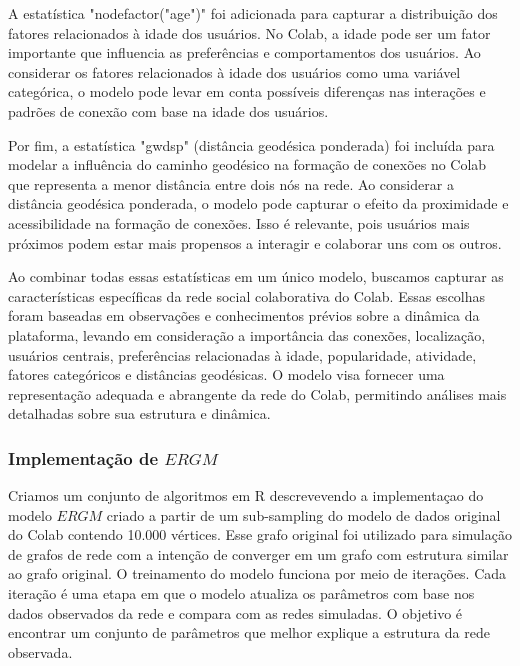 A estatística "nodefactor("age")" foi adicionada para capturar a distribuição dos fatores relacionados à idade dos usuários. No Colab, a idade pode ser um fator importante que influencia as preferências e comportamentos dos usuários. Ao considerar os fatores relacionados à idade dos usuários como uma variável categórica, o modelo pode levar em conta possíveis diferenças nas interações e padrões de conexão com base na idade dos usuários.

Por fim, a estatística "gwdsp" (distância geodésica ponderada) foi incluída para modelar a influência do caminho geodésico na formação de conexões no Colab que representa a menor distância entre dois nós na rede. Ao considerar a distância geodésica ponderada, o modelo pode capturar o efeito da proximidade e acessibilidade na formação de conexões. Isso é relevante, pois usuários mais próximos podem estar mais propensos a interagir e colaborar uns com os outros.

Ao combinar todas essas estatísticas em um único modelo, buscamos capturar as características específicas da rede social colaborativa do Colab. Essas escolhas foram baseadas em observações e conhecimentos prévios sobre a dinâmica da plataforma, levando em consideração a importância das conexões, localização, usuários centrais, preferências relacionadas à idade, popularidade, atividade, fatores categóricos e distâncias geodésicas. O modelo visa fornecer uma representação adequada e abrangente da rede do Colab, permitindo análises mais detalhadas sobre sua estrutura e dinâmica.

\subsubsection*{Implementação de $ERGM$}

Criamos um conjunto de algoritmos em R descrevevendo a implementaçao do modelo $ERGM$ criado a partir de um sub-sampling do modelo de dados original do Colab contendo 10.000 vértices. Esse grafo original foi utilizado para simulação de grafos de rede com a intenção de converger em um grafo com estrutura similar ao grafo original. O treinamento do modelo funciona por meio de iterações. Cada iteração é uma etapa em que o modelo atualiza os parâmetros com base nos dados observados da rede e compara com as redes simuladas. O objetivo é encontrar um conjunto de parâmetros que melhor explique a estrutura da rede observada.

